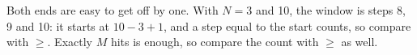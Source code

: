 \begin{parts}
    \begin{longhint}
        Both ends are easy to get off by one. With \(N = 3\) and  10, the window is steps 8, 9 and 10: it starts at \(10 - 3 + 1\), and a step equal to the start counts, so compare with \(\geq\). Exactly \(M\) hits is enough, so compare the count with \(\geq\) as well.
    \end{longhint}
    \begin{solution}  \end{solution}

\end{parts}
